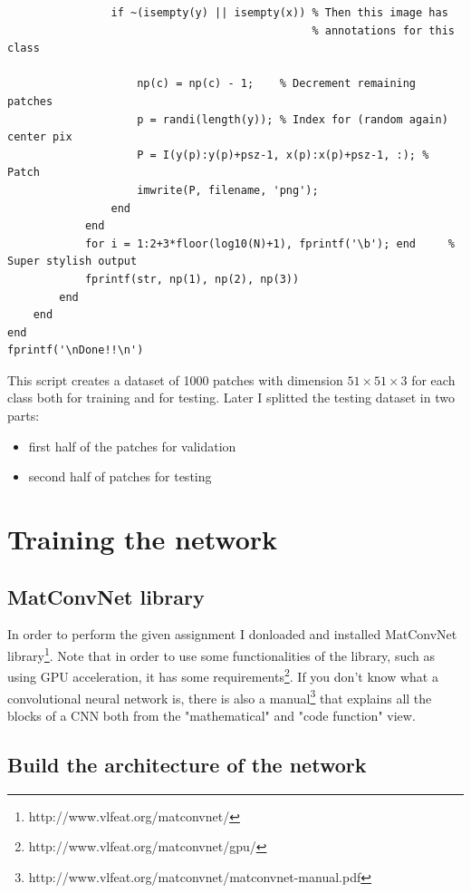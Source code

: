 \documentclass[]{report}
\begin{document}
\begin{lstlisting}
                if ~(isempty(y) || isempty(x)) % Then this image has 
                                               % annotations for this class 
               
                    np(c) = np(c) - 1;    % Decrement remaining patches
                    p = randi(length(y)); % Index for (random again) center pix
                    P = I(y(p):y(p)+psz-1, x(p):x(p)+psz-1, :); % Patch
                    imwrite(P, filename, 'png');
                end  
            end
            for i = 1:2+3*floor(log10(N)+1), fprintf('\b'); end     % Super stylish output
            fprintf(str, np(1), np(2), np(3))
        end
    end
end
fprintf('\nDone!!\n')

\end{lstlisting}

This script creates a dataset of 1000 patches with dimension $ 51\times51\times3 $ for each class both for training and for testing. Later I splitted the testing dataset in two parts:
\begin{itemize}
\item first half of the patches for validation
\item second half of patches for testing

\end{itemize}   

\chapter{Training the network}

\section{MatConvNet library}

In order to perform the given assignment I donloaded and installed MatConvNet library\footnote{http://www.vlfeat.org/matconvnet/}. Note that in order to use some functionalities of the library, such as using GPU acceleration, it has some requirements\footnote{http://www.vlfeat.org/matconvnet/gpu/}.
If you don't know what a convolutional neural network is, there is also a manual\footnote{http://www.vlfeat.org/matconvnet/matconvnet-manual.pdf} that explains all the blocks of a CNN both from the "mathematical" and "code function" view.  

\section{Build the architecture of the network}
\end{document}
